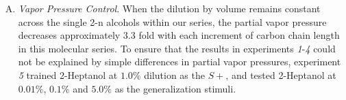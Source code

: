 \begin{enumerate}[(A)]
\item \textit{Vapor Pressure Control}. When the dilution by volume remains constant across the single 2-n alcohols within our series, the partial vapor pressure decreases approximately 3.3 fold with each increment of carbon chain length in this molecular series. 
To ensure that the results in experiments \textit{1}-\textit{4} could not be explained by simple differences in partial vapor pressures, experiment \textit{5} trained 2-Heptanol at $1.0\%$ dilution as the $S+$, and tested 2-Heptanol at $0.01\%$, $0.1\%$ and $5.0\%$ as the generalization stimuli.

\end{enumerate}

  
  
  
  
  
  
  
  
  